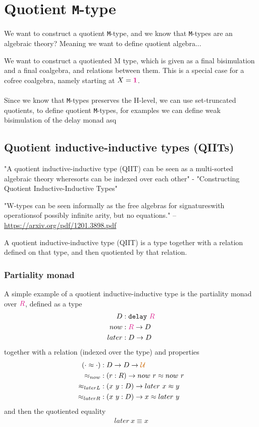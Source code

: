 \documentclass[twoside,11pt,openright]{report}
\theoremstyle{plain} %
\theoremstyle{definition}
\theoremstyle{remark}
\newcommand*{\type}[1]{\textcolor{magenta!90!black}{#1}}
\newcommand*{\universe}[1]{\textcolor{orange!80!black}{#1}}
\newcommand*{\unit}{\type{\textbf{1}}}
\newcommand*{\typeformer}[1]{\ensuremath{\mathtt{#1}}}
\begin{document}
\section{Quotient \texttt{M}-type}
We want to construct a quotient \texttt{M}-type, and we know that \texttt{M}-types are an algebraic theory? Meaning we want to define quotient algebra...

We want to construct a quotiented M type, which is given as a final bisimulation and a final coalgebra, and relations between them. This is a special case for a cofree coalgebra, namely starting at \(X = \unit\).
\\ \\
Since we know that \texttt{M}-types preserves the H-level, we can use set-truncated quotients, to define quotient \texttt{M}-types, for examples we can define weak bisimulation of the delay monad asq

\subsection{Quotient inductive-inductive types (QIITs)}
"A quotient inductive-inductive type (QIIT) can be seen as a multi-sorted algebraic theory wheresorts can be indexed over each other" - "Constructing Quotient Inductive-Inductive Types"

"W-types can be seen informally as the free algebras for signatureswith operationsof possibly infinite arity, but no equations." -- \url{https://arxiv.org/pdf/1201.3898.pdf}

A quotient inductive-inductive type (QIIT) is a type together with a relation defined on that type, and then quotiented by that relation.
\subsubsection{Partiality monad}
A simple example of a quotient inductive-inductive type is the partiality monad over \(\type{R}\), defined as a type
\begin{align}
  D &: \typeformer{delay}~\type{R} \\
  now &: \type{R} \rightarrow D \\
  later &: D \rightarrow D
\end{align}
together with a relation (indexed over the type) and properties
\begin{align}
  (\cdot \approx \cdot) &: D \rightarrow D \rightarrow \universe{\mathcal{U}} \\
  \approx_{now} &: (r : R) \rightarrow now~r \approx now~r \\
  \approx_{laterL} &: (x~y : D) \rightarrow later~x \approx y \\
  \approx_{laterR} &: (x~y : D) \rightarrow x \approx later~y
\end{align}
and then the quotiented equality
\begin{align}
  later~x \equiv x
\end{align}
\end{document}
